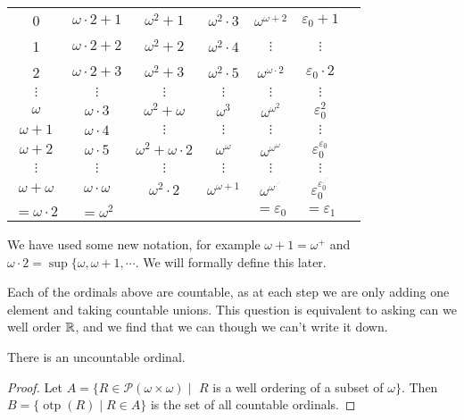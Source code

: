 \documentclass[a3paper, 10pt]{article}
\begin{document}
\begin{multicols*}{5}
\begin{center}
  \small
  \begin{tabular}{ccccccc}
    0 & $\omega\cdot 2 + 1$ & $\omega^2 + 1$ & $\omega^2\cdot 3$ & $\omega^{\omega + 2}$ & $\varepsilon_0 + 1$ \\
    1 & $\omega\cdot 2 + 2$ & $\omega^2 + 2$ & $\omega^2\cdot 4$ & $\vdots$ & $\vdots$ \\
    2 & $\omega\cdot 2 + 3$ & $\omega^2 + 3$ & $\omega^2\cdot 5$ & $\omega^{\omega \cdot 2}$ & $\varepsilon_0 \cdot 2$ \\
    $\vdots$ & $\vdots$ & $\vdots$ & $\vdots$ & $\vdots$ & $\vdots$ \\
    $\omega$ & $\omega\cdot 3$ & $\omega^2 + \omega$ & $\omega^3$ & $\omega^{\omega^2}$ & $\varepsilon_0^2$ \\
    $\omega + 1$ & $\omega\cdot 4$ & $\vdots$ & $\vdots$ & $\vdots$ & $\vdots$ \\
    $\omega + 2$ & $\omega\cdot 5$ & $\omega^2 + \omega \cdot 2$ & $\omega^\omega$ & $\omega^{\omega^{\omega}}$ & $\varepsilon_0^{\varepsilon_0}$ \\
    $\vdots$ & $\vdots$ & $\vdots$ & $\vdots$ & $\vdots$ & $\vdots$ \\
    $\omega + \omega$ & $\omega\cdot \omega $ & $\omega^2 \cdot 2$ & $\omega^{\omega + 1}$ & $\omega^{\omega^{.^{.^.}}}$ & $\varepsilon_0^{\varepsilon_0^{.^{.^.}}}$ \\
    $=\omega\cdot 2$ & $=\omega^2$ & &  & $= \varepsilon_0$ & $= \varepsilon_1$ \\
  \end{tabular}
\end{center}

We have used some new notation, for example $\omega + 1 = \omega^+$ and $\omega \cdot 2 = \sup \{\omega, \omega+1, \cdots$. We will formally define this later.

Each of the ordinals above are countable, as at each step we are only adding one element and taking countable unions. This question is equivalent to asking can we well order $\mathbb{R}$, and we find that we can though we can't write it down.

\begin{theorem}
  There is an uncountable ordinal.
\end{theorem}
\begin{proof}
  Let $A = \{R \in \mathcal{P}(\omega \times \omega) \mid$ $R$ is a well ordering of a subset of $\omega \}$. 
  Then $B = \{\operatorname{otp}(R) \mid R \in A\}$ is the set of all countable ordinals. 


\end{proof}
\end{multicols*}
\end{document}
